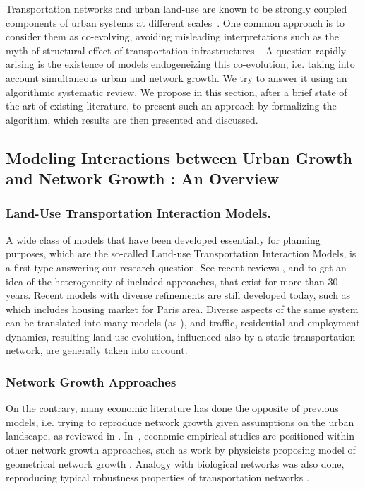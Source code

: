 Transportation networks and urban land-use are known to be strongly coupled components of urban systems at different scales~\cite{bretagnolle2009organization}. One common approach is to consider them as co-evolving, avoiding misleading interpretations such as the myth of structural effect of transportation infrastructures~\cite{offner1993effets}. A question rapidly arising is the existence of models endogeneizing this co-evolution, i.e. taking into account simultaneous urban and network growth. We try to answer it using an algorithmic systematic review. We propose in this section, after a brief state of the art of existing literature, to present such an approach by formalizing the algorithm, which results are then presented and discussed. 

\subsection{Modeling Interactions between Urban Growth and Network Growth : An Overview}

\subsubsection{Land-Use Transportation Interaction Models.}

A wide class of models that have been developed essentially for planning purposes, which are the so-called Land-use Transportation Interaction Models, is a first type answering our research question. See recent reviews \cite{chang2006models}, \cite{iacono2008models} and \cite{wegener2004land} to get an idea of the heterogeneity of included approaches, that exist for more than 30 years. Recent models with diverse refinements are still developed today, such as \cite{delons:hal-00319087} which includes housing market for Paris area. Diverse aspects of the same system can be translated into many models (as \eg \cite{wegener1991one}), and traffic, residential and employment dynamics, resulting land-use evolution, influenced also by a static transportation network, are generally taken into account.

\subsubsection{Network Growth Approaches}

On the contrary, many economic literature has done the opposite of previous models, i.e. trying to reproduce network growth given assumptions on the urban landscape, as reviewed in \cite{zhang2007economics}. In~\cite{xie2009modeling}, economic empirical studies are positioned within other network growth approaches, such as work by physicists proposing model of geometrical network growth \cite{barthelemy2008modeling}. Analogy with biological networks was also done, reproducing typical robustness properties of transportation networks \cite{tero2010rules}.

